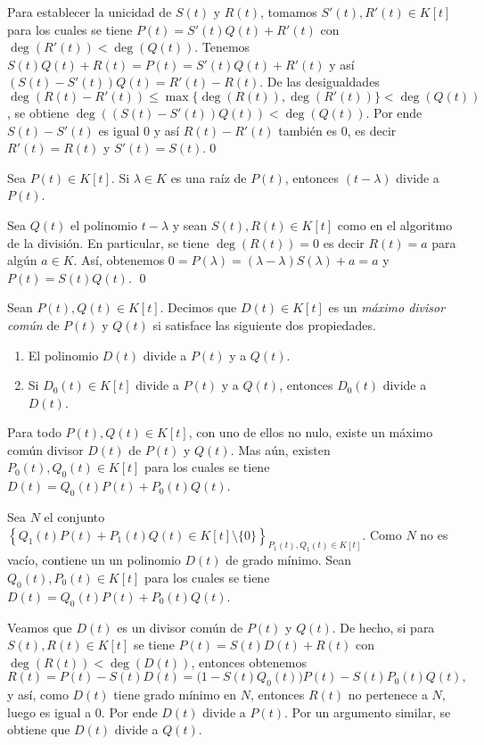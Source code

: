 Para establecer la unicidad de $S(t)$ y $R(t)$, tomamos $S'(t),R'(t)\in K[t]$ para los cuales se tiene $P(t)=S'(t)Q(t)+R'(t)$ con $\deg\left(R'(t)\right)<\deg\left(Q(t)\right)$. Tenemos $S(t)Q(t)+R(t)=P(t)=S'(t)Q(t)+R'(t)$ y as\'i $\left(S(t)-S'(t)\right)Q(t)=R'(t)-R(t)$. De las desigualdades $\deg\left(R(t)-R'(t)\right)\le \max\{\deg\left(R(t)\right),\deg\left(R'(t)\right)\}<\deg\left(Q(t)\right)$, se obtiene $\deg(\left(S(t)-S'(t)\right)Q(t))<\deg\left(Q(t)\right)$. Por ende $S(t)-S'(t)$ es igual $0$ y as\'i $R(t)-R'(t)$ tambi\'en es $0$, es decir $R'(t)=R(t)$ y $S'(t)=S(t)$.\qed

\begin{coro}
Sea $P(t)\in K[t]$. Si $\lambda\in K$ es una ra\'iz de $P(t)$, entonces $(t-\lambda)$ divide a $P(t)$.
\end{coro}

\dem Sea $Q(t)$ el polinomio $t-\lambda$ y sean $S(t),R(t)\in K[t]$ como en el algoritmo de la divisi\'on. En particular, se tiene $\deg\left(R(t)\right)=0$ es decir $R(t)=a$ para alg\'un $a\in K$. As\'i, obtenemos $0=P(\lambda)=(\lambda-\lambda)S(\lambda)+a=a$ y $P(t)=S(t)Q(t)$. \qed

\begin{defn}
Sean $P(t),Q(t)\in K[t]$. Decimos que $D(t)\in K[t]$ es un \emph{m\'aximo divisor com\'un} de $P(t)$ y $Q(t)$ si satisface las siguiente dos propiedades.
\begin{enumerate}
\item El polinomio $D(t)$ divide a $P(t)$ y a $Q(t)$.
\item Si $D_0(t)\in K[t]$ divide a $P(t)$ y a $Q(t)$, entonces $D_0(t)$ divide a $D(t)$. 
\end{enumerate}
\end{defn}

\begin{prop}
Para todo $P(t),Q(t)\in K[t]$, con uno de ellos no nulo, existe un m\'aximo com\'un divisor $D(t)$ de $P(t)$ y $Q(t)$. Mas a\'un, existen $P_0(t),Q_0(t)\in K[t]$ para los cuales se tiene $D(t)=Q_0(t)P(t)+P_0(t)Q(t)$.
\end{prop}

\dem Sea $N$ el conjunto $\left\{Q_1(t)P(t)+P_1(t)Q(t)\in K[t]\setminus\{0\}\right\}_{P_1(t),Q_1(t)\in K[t]}$.
Como $N$ no es vac\'io, contiene un un polinomio $D(t)$ de grado m\'inimo. Sean $Q_0(t),P_0(t)\in K[t]$ para los cuales se tiene $D(t)=Q_0(t)P(t)+P_0(t)Q(t)$.

Veamos que $D(t)$ es un divisor com\'un de $P(t)$ y $Q(t)$. De hecho, si para $S(t),R(t)\in K[t]$ se tiene $P(t)=S(t)D(t)+R(t)$ con $\deg\left(R(t)\right)<\deg\left(D(t)\right)$, entonces obtenemos
$$R(t)=P(t)-S(t)D(t)=\Big(1-S(t)Q_0(t)\Big)P(t)-S(t)P_0(t)Q(t),$$
y as\'i, como $D(t)$ tiene grado m\'inimo en $N$, entonces $R(t)$ no pertenece a $N$, luego es igual a $0$. Por ende $D(t)$ divide a $P(t)$. Por un argumento similar, se obtiene que $D(t)$ divide a $Q(t)$.

